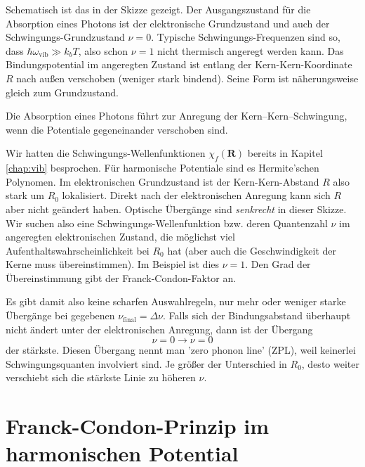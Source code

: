 Schematisch ist das in der Skizze gezeigt. Der Ausgangszustand für die Absorption eines Photons ist der elektronische Grundzustand und auch der Schwingungs-Grundzustand $\nu = 0$. Typische Schwingungs-Frequenzen sind so, dass $\hbar \omega_\text{vib} \gg k_b T$, also schon $\nu =1$ nicht thermisch angeregt werden kann. Das Bindungspotential im angeregten Zustand ist entlang der Kern-Kern-Koordinate $R$ nach außen verschoben (weniger stark bindend). Seine Form ist näherungsweise gleich zum Grundzustand. 

\begin{marginfigure}
\caption{Die Absorption eines Photons führt zur Anregung der Kern--Kern--Schwingung, wenn die Potentiale gegeneinander verschoben sind.}
\end{marginfigure}

Wir hatten die Schwingungs-Wellenfunktionen $\chi_f(\mathbf{R})$ bereits in Kapitel \ref{chap:vib} besprochen. Für harmonische Potentiale sind es Hermite'schen Polynomen. Im elektronischen Grundzustand ist der Kern-Kern-Abstand $R$ also stark um $R_0$ lokalisiert. Direkt nach der elektronischen Anregung kann sich $R$ aber nicht geändert haben. Optische Übergänge sind \emph{senkrecht} in dieser Skizze. Wir suchen also eine Schwingungs-Wellenfunktion bzw. deren Quantenzahl $\nu$ im angeregten elektronischen Zustand, die möglichst viel Aufenthaltswahrscheinlichkeit bei $R_0$ hat (aber auch die Geschwindigkeit der Kerne muss übereinstimmen). Im Beispiel ist dies $\nu = 1$. Den Grad der Übereinstimmung gibt der Franck-Condon-Faktor an.

Es gibt damit also keine scharfen Auswahlregeln, nur mehr oder weniger starke Übergänge bei gegebenen $\nu_\text{final}  = \Delta \nu$. Falls sich der Bindungsabstand überhaupt nicht ändert unter der elektronischen Anregung, dann ist der Übergang
\begin{equation}
 \nu = 0 \rightarrow \nu = 0
\end{equation}
der stärkste. Diesen Übergang nennt man 'zero phonon line' (ZPL), weil keinerlei Schwingungsquanten involviert sind. Je größer der Unterschied in $R_0$, desto weiter verschiebt sich die stärkste Linie zu höheren $\nu$. 



\section{Franck-Condon-Prinzip im harmonischen Potential}

